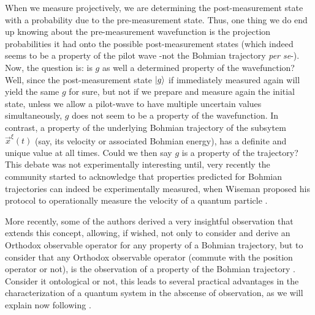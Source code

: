 \documentclass[11pt, a4paper]{article} %
\begin{document}
When we measure projectively, we are determining the post-measurement state with a probability due to the pre-measurement state. Thus, one thing we do end up knowing about the pre-measurement wavefunction is the projection probabilities it had onto the possible post-measurement states (which indeed seems to be a property of the pilot wave -not the Bohmian trajectory {\em per se}-). Now, the question is: is $g$ as well a determined property of the wavefunction? Well, since the post-measurement state $\ket{g}$ if immediately measured again will yield the same $g$ for sure, but not if we prepare and measure again the initial state, unless we allow a pilot-wave to have multiple uncertain values simultaneously, $g$ does not seem to be a property of the wavefunction. In contrast, a property of the underlying Bohmian trajectory of the subsytem $\vec{x}^\xi(t)$ (say, its velocity or associated Bohmian energy), has a definite and unique value at all times. Could we then say $g$ is a property of the trajectory? This debate was not experimentally interesting until, very recently the community started to acknowledge that properties predicted for Bohmian trajectories can indeed be experimentally measured, when Wiseman proposed his protocol to operationally measure the velocity of a quantum particle \cite{WisemanVel}.

More recently, some of the authors derived a very insightful observation that extends this concept, allowing, if wished, not only to consider and derive an Orthodox observable operator for any property of a Bohmian trajectory, but to consider that any Orthodox observable operator (commute with the position operator or not), is the observation of a property of the Bohmian trajectory \cite{DevInPosition1, DevInPosition2}. Consider it ontological or not, this leads to several practical advantages in the characterization of a quantum system in the abscense of observation, as we will explain now following \cite{DevInPosition1, DevInPosition2}.
\end{document}
